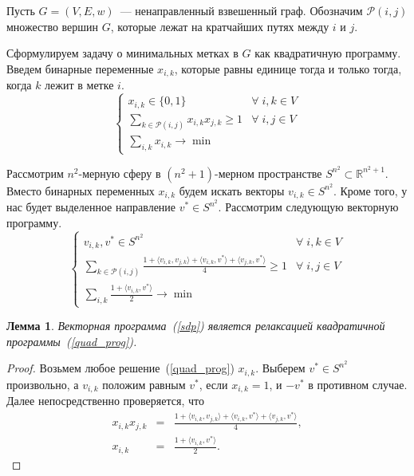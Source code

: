 \documentclass[12pt]{article}
\newcommand{\Pc}{\mathcal{P}}
\newcommand{\Rbb}{\mathbb{R}}
\newtheorem{lemma}{Лемма}
\begin{document}
    Пусть $G = (V, E, w)$~--- ненаправленный взвешенный граф.
    Обозначим $\Pc(i, j)$ множество вершин $G$, которые лежат на кратчайших путях между $i$ и $j$.

    Сформулируем задачу о минимальных метках в $G$ как квадратичную программу.
    Введем бинарные переменные $x_{i, k}$, которые равны единице тогда и только тогда, когда $k$ лежит в метке $i$.
    \begin{equation}
        \label{quad_prog}
        \begin{cases}
            x_{i,k} \in \{0, 1\} & \forall \; i, k \in V\\ 
            \sum_{k \in \Pc(i, j)} x_{i, k} x_{j, k} \geq 1 & \forall \; i, j \in V\\
            \sum_{i,k} x_{i,k} \to \min
        \end{cases}
    \end{equation}

    Рассмотрим $n^2$-мерную сферу в $(n^2+1)$-мерном пространстве $S^{n^2} \subset \Rbb^{n^2 + 1}$.
    Вместо бинарных переменных $x_{i,k}$ будем искать векторы $v_{i,k} \in S^{n^2}$.
    Кроме того, у нас будет выделенное направление $v^* \in S^{n^2}$.
    Рассмотрим следующую векторную программу.
    \begin{equation}
        \label{sdp}
        \begin{cases}
            v_{i,k}, v^* \in S^{n^2} & \forall \; i, k \in V \\
            \sum_{k \in \Pc(i, j)} \frac{1 + \langle v_{i,k}, v_{j, k} \rangle +
                                             \langle v_{i,k}, v^* \rangle +
                                             \langle v_{j,k}, v^* \rangle}{4} \geq 1 & \forall \; i, j \in V \\
            \sum_{i,k} \frac{1 + \langle v_{i,k}, v^* \rangle}{2} \to \min
        \end{cases}
    \end{equation}

    \begin{lemma}
        Векторная программа~(\ref{sdp}) является релаксацией квадратичной программы~(\ref{quad_prog}).
    \end{lemma}
    \begin{proof}
        Возьмем любое решение~(\ref{quad_prog}) $x_{i,k}$. Выберем $v^* \in S^{n^2}$ произвольно, а
        $v_{i,k}$ положим равным $v^*$, если $x_{i,k} = 1$, и $-v^*$ в противном случае.
        Далее непосредственно проверяется, что
        \begin{eqnarray*}
            x_{i,k} x_{j,k} &=& \frac{1 + \langle v_{i,k}, v_{j, k} \rangle +
                                             \langle v_{i,k}, v^* \rangle +
                                             \langle v_{j,k}, v^* \rangle}{4},\\
           x_{i,k} &=& \frac{1 + \langle v_{i,k}, v^* \rangle}{2}.
        \end{eqnarray*}
    \end{proof}
\end{document}
